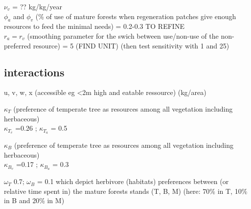 $\nu_v$ = ?? kg/kg/year \\


$\phi_a$ and $\phi_v$ (\% of use of mature forests when regeneration patches give enough resources to feed the minimal needs) = 0.2-0.3 TO REFINE \\

$r_a = r_v$ (smoothing parameter for the swich between use/non-use of the non-
preferred resource) = 5 (FIND UNIT) (then test sensitivity with 1 and 25)\\

\subsection*{interactions}

u, v, w, x (accessible eg <2m high and eatable ressource) (kg/area)

$\kappa_T$ (preference of temperate tree as resources among all vegetation including herbaceous)\\
$\kappa_{T_v}$ =0.26 ; $\kappa_{T_a}$ = 0.5

$\kappa_B$ (preference of temperate tree as resources among all vegetation including herbaceous) \\
$\kappa_{B_v}$ =0.17 ; $\kappa_{B_a}$ = 0.3

$\omega_T$ 0.7; $\omega_B$ = 0.1 which depict herbivore (habitats) preferences between (or relative time spent in) the mature forests stands (T, B, M) (here: 70\% in T, 10\% in B and 20\% in M)











